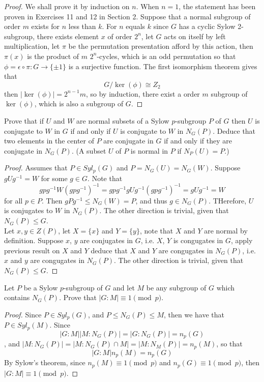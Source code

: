 \documentclass{article}
\newenvironment{problem}[2][Problem]{\begin{trivlist}
\item[\hskip \labelsep {\bfseries #1}\hskip \labelsep {\bfseries #2.}]}{\end{trivlist}}
\begin{document}
\begin{proof}
    We shall prove it by induction on $n$. When $n=1$, the statement has been proven in Exercises 11 and 12 in Section 2. Suppose that a normal subgroup of order $m$ exists for $n$ less than $k$. For $n$ equals $k$ since $G$ has a cyclic Sylow 2-subgroup, there exists element $x$ of order $2^n$, let $G$ acts on itself by left multiplication, let $\pi$ be the permutation presentation afford by this action, then $\pi(x)$ is the product of $m$ $2^n$-cycles, which is an odd permutation so that $\phi = \epsilon \circ \pi: G \rightarrow \{\pm 1\}$ is a surjective function. The first isomorphism theorem gives that 
    \[
        G/\ker(\phi) \cong Z_2
    \]
    then $|\ker(\phi)|=2^{n-1}m$, so by induction, there exist a order $m$ subgroup of $\ker(\phi)$, which is also a subgroup of $G$. 
\end{proof}
\begin{problem}{50}
        Prove that if $U$ and $W$ are normal subsets of a Sylow $p$-subgroup $P$ of $G$ then $U$ is conjugate to $W$ in $G$ if and only if $U$ is conjugate to $W$ in $N_G(P)$. Deduce that two elements in the center of $P$ are conjugate in $G$ if and only if they are conjugate in $N_G(P)$. 
    (A subset $U$ of $P$ is normal in $P$ if $N_P(U) = P$.)
\end{problem}
\begin{proof}
    Assumes that $P\in Syl_p(G)$ and $P=N_G(U)=N_G(W)$. Suppose $gUg^{-1}=W$ for some $g\in G$. Note that 
    \[
        gpg^{-1}W(gpg^{-1})^{-1}=gpg^{-1}gUg^{-1}(gpg^{-1})^{-1}=gUg^{-1}=W
    \]
    for all $p\in P$. Then $gPg^{-1}\leq N_G(W)=P$, and thus $g\in N_G(P)$. THerefore, $U$ is conjugates to $W$ in $N_G(P)$. The other direction is trivial, given that $N_G(P)\leq G$.\\
    Let $x, y\in Z(P)$, let $X=\{x\}$ and $Y=\{y\}$, note that $X$ and $Y$ are normal by definition. Suppose $x$, $y$ are conjugates in $G$, i.e. $X$, $Y$ is congugates in $G$, apply previous result on $X$ and $Y$ deduce that $X$ and $Y$ are congugates in $N_G(P)$, i.e. $x$ and $y$ are congugates in $N_G(P)$. The other direction is trivial, given that $N_G(P)\leq G$.
\end{proof}
\begin{problem}{51}
    Let $P$ be a Sylow $p$-subgroup of $G$ and let $M$ be any subgroup of $G$ which contains $N_G(P)$. Prove that $|G : M| \equiv 1 \pmod{p}$.
\end{problem}
\begin{proof}
    Since $P\in Syl_p(G)$, and $P\leq N_G(P)\leq M$, then we have that $P\in Syl_p(M)$. Since \[|G:M||M:N_G(P)|=|G:N_G(P)|=n_p(G)\], and $|M:N_G(P)|=|M:N_G(P)\cap M|=|M:N_M(P)|=n_p(M)$, so that 
    \[
        |G:M|n_p(M)=n_p(G)
    \]
    By Sylow's theorem, since $n_p(M)\equiv 1 \pmod p$ and $n_p(G) \equiv 1 \pmod p$, then $|G:M| \equiv 1 \pmod p$.
\end{proof}
\end{document}
